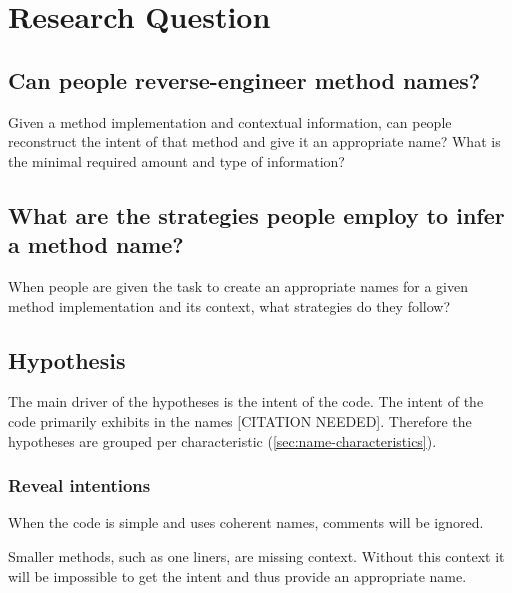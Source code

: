 \section{Research Question}

\subsection{Can people reverse-engineer method names?}
Given a method implementation and contextual information, can people reconstruct the intent of that method and give it an appropriate name? What is the minimal required amount and type of information?

\subsection{What are the strategies people employ to infer a method name?}
When people are given the task to create an appropriate names for a given method implementation and its context, what strategies do they follow? 

\subsection{Hypothesis}

The main driver of the hypotheses is the intent of the code. The intent of the code primarily exhibits in the names {\color{red}[CITATION NEEDED]}. Therefore the hypotheses are grouped per characteristic (\ref{sec:name-characteristics}).


\subsubsection{Reveal intentions}
\begin{subhyp}
	\begin{hyp}
 		When the code is simple and uses coherent names, comments will be ignored.
	\end{hyp}
	\begin{hyp}
 		Smaller methods, such as one liners, are missing context. Without this context it will be impossible to get the intent and thus provide an appropriate name.
	\end{hyp}
\end{subhyp}


